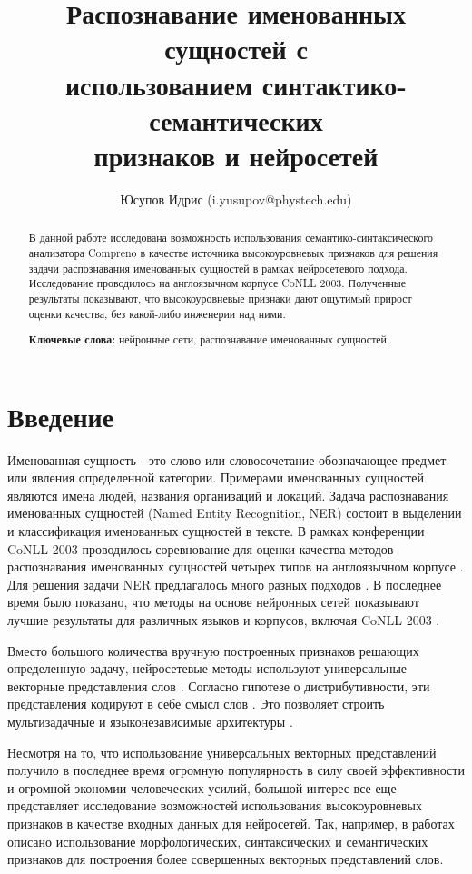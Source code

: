 \documentclass[a4paper,12pt]{article}
\date{}
\title{Распознавание именованных сущностей с \protect\\ использованием синтактико-семантических \protect\\ признаков и нейросетей}
\author{Юсупов Идрис (i.yusupov@phystech.edu)}
\affil{Московский физико-технический институт}
\begin{document}
\maketitle
\thispagestyle{empty}
\begin{abstract}
В данной работе исследована возможность использования се\-ман\-ти\-ко-син\-так\-си\-чес\-ко\-го
анализатора Compreno в качестве источника высокоуровневых признаков
для решения задачи распознавания именованных сущностей в рамках нейросетевого подхода.
Исследование проводилось на англоязычном корпусе CoNLL 2003.
Полученные результаты показывают, что высокоуровневые признаки
дают ощутимый прирост оценки качества, без какой-либо инженерии над ними.

\smallskip
\noindent \textbf{Ключевые слова:} нейронные сети, распознавание именованных сущностей.
\end{abstract}

\newpage

\section{Введение}
  Именованная сущность - это слово или словосочетание обозначающее
  предмет или явления определенной категории. Примерами именованных сущностей
  являются имена людей, названия организаций и локаций.
  Задача распознавания именованных сущностей (Named Entity Recognition, NER)
  состоит в выделении и классификация именованных сущностей в тексте.
  В рамках конференции CoNLL 2003 проводилось соревнование
  для оценки качества методов распознавания именованных сущностей четырех типов
  на англоязычном корпусе \citep{tjong2003introduction}.
  Для решения задачи NER предлагалось много разных подходов \citep{nadeau2007survey}.
  В последнее время было показано, что методы на основе нейронных сетей показывают
  лучшие результаты для различных языков и корпусов, включая CoNLL 2003 \citep{DBLP:journals/corr/YangSC16}.

  Вместо большого количества вручную построенных признаков
  решающих определенную задачу, нейросетевые методы используют универсальные
  векторные представления слов \citep{mikolov2013distributed}.
  Согласно гипотезе о дистрибутивности, эти представления
  кодируют в себе смысл слов \citep{sahlgren2008distributional}.
  Это позволяет строить мультизадачные и языконезависимые
  архитектуры \citep{collobert2011natural, DBLP:journals/corr/YangSC16}.

  Несмотря на то, что использование универсальных векторных представлений
  получило в последнее время огромную популярность в силу своей эффективности
  и огромной экономии человеческих усилий, большой интерес все еще представляет
  исследование возможностей использования высокоуровневых признаков
  в качестве входных данных для нейросетей.
  Так, например, в работах \citep{xu2014rc, bian2014knowledge} описано использование
  морфологических, синтаксических и семантических признаков для построения
  более совершенных векторных представлений слов.
\end{document}
